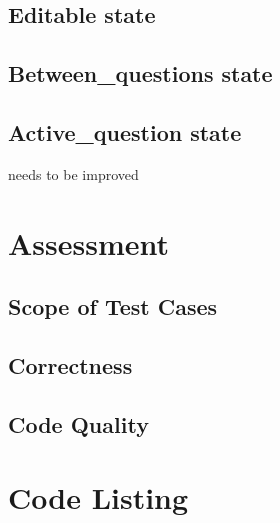 \documentclass[12pt,a4paper]{article}
\begin{document}
\subsection{Editable state}
\subsection{Between\_questions state}
\subsection{Active\_question state}

needs to be improved

\section{Assessment}

\subsection{Scope of Test Cases}

\subsection{Correctness}

\subsection{Code Quality}


\appendix
\section{Code Listing}
\end{document}
